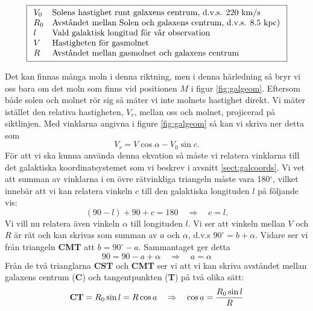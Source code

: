\begin{displaymath}
	\boxed{
\begin{array}{ll}
	V_0 	&\hbox{Solens hastighet runt galaxens centrum, d.v.s. 220 km/s}					\\
    R_0	&\hbox{Avståndet mellan Solen och galaxens centrum, d.v.s. 8.5 kpc}) 					\\
l	&\hbox{Vald galaktisk longitud för vår observation}				\\
V	&\hbox{Hastigheten för gasmolnet}			\\
R	&\hbox{Avståndet mellan gasmolnet och galaxens centrum}		\\
\end{array}
}
\end{displaymath}

Det kan finnas många moln i denna riktning, men i denna härledning så bryr vi oss
bara om det moln som finns vid positionen $M$ i figur \ref{fig:galgeom}. Eftersom
både solen och molnet rör sig så mäter vi inte molnets hastighet direkt. Vi mäter
istället den relativa hastigheten, $V_r$, mellan oss och molnet, projicerad på
siktlinjen. Med vinklarna angivna i figure \ref{fig:galgeom} så kan vi 
skriva ner detta som  
\begin{equation}
V_r = V \cos\alpha - V_0 \sin c .
\label{eqn:vrel1}
\end{equation}
För att vi ska kunna använda denna ekvation så måste vi relatera vinklarna till
det galaktiska koordinatsystemet som vi beskrev i avsnitt \ref{sect:galcoords}.
Vi vet att summan av vinklarna i en övre rätvinkliga triangeln måste vara
180$^\circ$, vilket innebär att vi kan relatera vinkeln $c$ till den galaktiska
longituden $l$ på följande vis:
\begin{equation}
(90-l)+90+c=180 \quad \Rightarrow \quad c=l.
\label{eqn:c}
\end{equation}
Vi vill nu relatera även vinkeln $\alpha$ till longituden $l$. Vi ser att vinkeln 
mellan $V$ och $R$ är rät och kan skrivas som summan av $a$ och $\alpha$, d.v.s
$90^\circ = b + \alpha$. Vidare ser vi från triangeln {\bf CMT} att $b = 90^\circ - a$.
Sammantaget ger detta 
\begin{equation}
    90 = 90-a+\alpha \quad \Rightarrow \quad a = \alpha
\label{eqn:a}
\end{equation}
Från de två trianglarna {\bf CST} och {\bf CMT} ser vi att vi kan skriva
avståndet mellan galaxens centrum ({\bf C}) och tangentpunkten ({\bf T}) på två
olika sätt:
\begin{equation}
	{\rm\bf CT} = R_0\sin l = R \cos a \quad \Rightarrow \quad \cos a = \frac{R_0\sin l}{R}
\label{eqn:cosalpha}
\end{equation}
